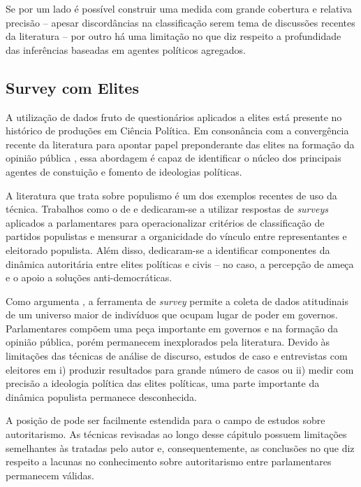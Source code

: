 \documentclass[
12pt,				%
openright,			%
twoside,			%
a4paper,			%
english,			%
french,				%
spanish,			%
brazil				%
]{abntex2}
\begin{document}
Se por um lado é possível construir uma medida com grande cobertura e relativa precisão -- apesar discordâncias na classificação serem tema de discussões recentes da literatura \cite{glasius2018authoritarianism, mudde2016introduction} -- por outro há uma limitação no que diz respeito a profundidade das inferências baseadas em agentes políticos agregados.

\vspace{2cm}

\subsection{Survey com Elites}

A utilização de dados fruto de questionários aplicados a elites está presente no histórico de produções em Ciência Política\cite{hoffmann2007methods, andreadis2017elite}. Em consonância com a convergência recente da literatura para apontar papel preponderante das elites na formação da opinião pública \cite{zaller1992nature, gabel2007estimating, achen2017democracy}, essa abordagem é capaz de identificar o núcleo dos principais agentes de constuição e fomento de ideologias políticas.

A literatura que trata sobre populismo é um dos exemplos recentes de uso da técnica. Trabalhos como o de  e  dedicaram-se a utilizar respostas de \emph{surveys} aplicados a parlamentares para operacionalizar critérios de classificação de partidos populistas e mensurar a organicidade do vínculo entre representantes e eleitorado populista. Além disso,  dedicaram-se a identificar componentes da dinâmica autoritária entre elites políticas e civis -- no caso, a percepção de ameça e o apoio a soluções anti-democráticas.

Como argumenta , a ferramenta de \emph{survey} permite a coleta de dados atitudinais de um universo maior de indivíduos que ocupam lugar de poder em governos. Parlamentares compõem uma peça importante em governos e na formação da opinião pública, porém permanecem inexplorados pela literatura. Devido às limitações das técnicas de análise de discurso, estudos de caso e entrevistas com eleitores em i) produzir resultados para grande número de casos ou ii) medir com precisão a ideologia política das elites políticas, uma parte importante da dinâmica populista permanece desconhecida. 

A posição de  pode ser facilmente estendida para o campo de estudos sobre autoritarismo. As técnicas revisadas ao longo desse cápitulo possuem limitações semelhantes às tratadas pelo autor e, consequentemente, as conclusões no que diz respeito a lacunas no conhecimento sobre autoritarismo entre parlamentares permanecem válidas. 
\end{document}
